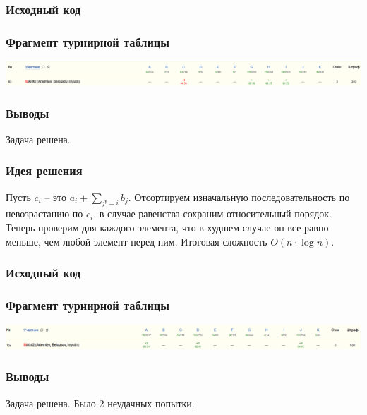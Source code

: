 \subsubsection*{Исходный код}

\subsubsection*{Фрагмент турнирной таблицы}
\includegraphics[width=\textwidth]{images/220207.png}\newline\noindent
\subsubsection*{Выводы}
Задача решена.
\pagebreak


\subsubsection*{Идея решения}
Пусть $c_i$ -- это $a_i + \sum_{j != i} b_j$. Отсортируем изначальную последовательность по невозрастанию по $c_i$, в случае равенства сохраним относительный порядок. Теперь проверим для каждого элемента, что в худшем случае он все равно меньше, чем любой элемент перед ним. Итоговая сложность $O(n\cdot \log{n})$.
\subsubsection*{Исходный код}

\subsubsection*{Фрагмент турнирной таблицы}
\includegraphics[width=\textwidth]{images/220208.png}\newline\noindent
\subsubsection*{Выводы}
Задача решена. Было 2 неудачных попытки.
\pagebreak

